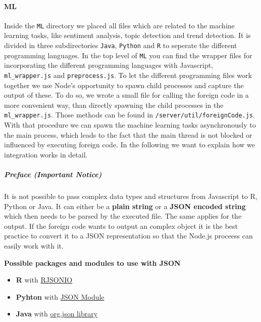 \documentclass[]{article}
\providecommand{\tightlist}{%
  \setlength{\itemsep}{0pt}\setlength{\parskip}{0pt}}
\let\oldparagraph\paragraph
\renewcommand{\paragraph}[1]{\oldparagraph{#1}\mbox{}}
\let\oldsubparagraph\subparagraph
\renewcommand{\subparagraph}[1]{\oldsubparagraph{#1}\mbox{}}
\begin{document}
\paragraph{ML}\label{ml}

Inside the \texttt{ML} directory we placed all files which are related
to the machine learning tasks, like sentiment analysis, topic detection
and trend detection. It is divided in three subdirectories
\texttt{Java}, \texttt{Python} and \texttt{R} to seperate the different
programming languages. In the top level of \texttt{ML} you can find the
wrapper files for incorporating the different programming languages with
Javascript, \texttt{ml\_wrapper.js} and \texttt{preprocess.js}. To let
the different programming files work together we use Node's opportunity
to spawn child processes and capture the output of these. To do so, we
wrote a small file for calling the foreign code in a more convenient
way, than directly spawning the child processes in the
\texttt{ml\_wrapper.js}. Those methods can be found in
\texttt{/server/util/foreignCode.js}.\\
With that procedure we can spawn the machine learning tasks
asynchronously to the main process, which leads to the fact that the
main thread is not blocked or influenced by executing foreign code. In
the following we want to explain how we integration works in detail.

\subparagraph{Preface (Important
Notice)}\label{preface-important-notice}

It is not possible to pass complex data types and structures from
Javascript to R, Python or Java. It can either be a \textbf{plain
string} or a \textbf{JSON encoded string} which then needs to be parsed
by the executed file. The same applies for the output. If the foreign
code wants to output an complex object it is the best practice to
convert it to a JSON representation so that the Node.js proceess can
easily work with it.

\textbf{Possible packages and modules to use with JSON}

\begin{itemize}
\tightlist
\item
  \textbf{R} with
  \href{https://cran.r-project.org/web/packages/RJSONIO/index.html}{RJSONIO}
\item
  \textbf{Pyhton} with
  \href{https://docs.python.org/2/library/json.html}{JSON Module}
\item
  \textbf{Java} with
  \href{https://github.com/stleary/JSON-java}{org.json library}
\end{itemize}
\end{document}
